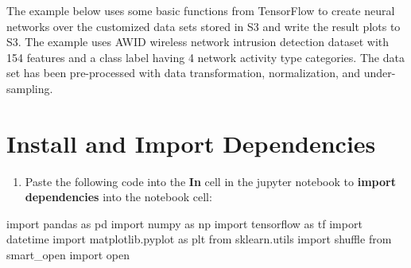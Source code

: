 \documentclass[]{book}
\newenvironment{Shaded}{\begin{snugshade}}{\end{snugshade}}
\newcommand{\ImportTok}[1]{#1}
\newcommand{\BuiltInTok}[1]{#1}
\newcommand{\NormalTok}[1]{#1}
\providecommand{\tightlist}{%
  \setlength{\itemsep}{0pt}\setlength{\parskip}{0pt}}
\begin{document}
The example below uses some basic functions from TensorFlow to create neural networks over the customized data sets stored in S3 and write the result plots to S3. The example uses AWID wireless network intrusion detection dataset with 154 features and a class label having 4 network activity type categories. The data set has been pre-processed with data transformation, normalization, and under-sampling.

\hypertarget{install-and-import-dependencies}{%
\section{Install and Import Dependencies}\label{install-and-import-dependencies}}

\begin{enumerate}
\def\labelenumi{\arabic{enumi}.}
\setcounter{enumi}{87}
\tightlist
\item
  Paste the following code into the \textbf{In} cell in the jupyter notebook to \textbf{import dependencies} into the notebook cell:
\end{enumerate}

\begin{Shaded}
\begin{Highlighting}[]
\ImportTok{import}\NormalTok{ pandas }\ImportTok{as}\NormalTok{ pd}
\ImportTok{import}\NormalTok{ numpy }\ImportTok{as}\NormalTok{ np}
\ImportTok{import}\NormalTok{ tensorflow }\ImportTok{as}\NormalTok{ tf}
\ImportTok{import}\NormalTok{ datetime}
\ImportTok{import}\NormalTok{ matplotlib.pyplot }\ImportTok{as}\NormalTok{ plt}
\ImportTok{from}\NormalTok{ sklearn.utils }\ImportTok{import}\NormalTok{ shuffle}
\ImportTok{from}\NormalTok{ smart_open }\ImportTok{import} \BuiltInTok{open}
\end{Highlighting}
\end{Shaded}
\end{document}
